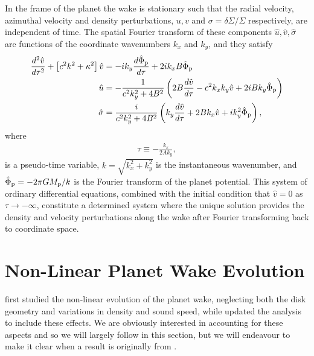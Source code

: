 In the frame of the planet the wake is stationary such that the radial velocity, azimuthal velocity and density perturbations, $u, v$ and $\sigma = \delta \Sigma / \Sigma$ respectively, are independent of time.
The spatial Fourier transform of these components $\hat{u}, \hat{v}, \hat{\sigma}$ are functions of the coordinate wavenumbers $k_x$ and $k_y$, and they satisfy \citep{goldreich1978,goldreich1980}
\begin{align}
    \frac{d^2 \hat{v}}{d \tau^2} + \left[ c^2 k^2 + \kappa^2 \right]\hat{v} &= -i k_y \frac{d \hat{\Phi}_{\rm p}}{d\tau} + 2i k_x B \hat{\Phi}_{\rm p} \label{eq:fourier_v} \\
    \hat{u} &= - \frac{1}{c^2 k_y^2 + 4 B^2} \left( 2 B \frac{d \hat{v}}{d\tau} - c^2 k_x k_y \hat{v} + 2iBk_y \hat{\Phi}_{\rm p} \right) \label{eq:fourier_u} \\
    \hat{\sigma} &= \frac{i}{c^2 k_y^2 + 4 B^2} \left( k_y \frac{d \hat{v}}{d \tau} + 2B k_x \hat{v} + i k_y^2 \hat{\Phi}_{\rm p} \right), \label{eq:fourier_sigma}
\end{align}
where
\begin{align}
    \tau \equiv -\frac{k_x}{2 A k_y},
\end{align}
is a pseudo-time variable, $k=\sqrt{k_x^2 + k_y^2}$ is the instantaneous wavenumber, and $\hat{\Phi}_{\rm p}=-2\pi G M_{\rm p} / k$ is the Fourier transform of the planet potential.
This system of ordinary differential equations, combined with the initial condition that $\hat{v}=0$ as $\tau \rightarrow - \infty$, constitute a determined system where the unique solution provides the density and velocity perturbations along the wake after Fourier transforming back to coordinate space.

\section{Non-Linear Planet Wake Evolution} \label{sec:nonlinear_evolution}

\citet{goodman2001} first studied the non-linear evolution of the planet wake, neglecting both the disk geometry and variations in density and sound speed, while \citet{rafikov2002a} updated the analysis to include these effects.
We are obviously interested in accounting for these aspects and so we will largely follow \citet{rafikov2002a} in this section, but we will endeavour to make it clear when a result is originally from \citet{goodman2001}.

